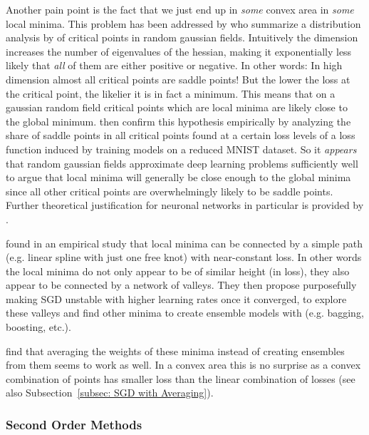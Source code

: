 Another pain point is the fact that we just end up in \emph{some} convex area in
\emph{some} local minima. This problem has been addressed by \textcite{pascanuSaddlePointProblem2014}
who summarize a distribution analysis by \textcite{brayStatisticsCriticalPoints2007}
of critical points in random gaussian fields. Intuitively the dimension
increases the number of eigenvalues of the hessian, making it
exponentially less likely that \emph{all} of them are either positive or 
negative. In other words: In high dimension almost all critical points are
saddle points! But the lower the loss at the critical point, the likelier it is
in fact a minimum. This means that on a gaussian random field critical points
which are local minima are likely close to the global minimum. \textcite{pascanuSaddlePointProblem2014}
then confirm this hypothesis empirically by analyzing the share of saddle
points in all critical points found at a certain loss levels of a loss function
induced by training models on a reduced MNIST dataset. So it \emph{appears} that
random gaussian fields approximate deep learning problems sufficiently well to
argue that local minima will generally be close enough to the global minima
since all other critical points are overwhelmingly likely to be saddle points.
Further theoretical justification for neuronal networks in particular is
provided by \textcite{choromanskaLossSurfacesMultilayer2015}.

\textcite{garipovLossSurfacesMode2018} found in an empirical study that local
minima can be connected by a simple path (e.g. linear spline with just one
free knot) with near-constant loss. In other words the local minima do not only
appear to be of similar height (in loss), they also appear to be connected
by a network of valleys. They then propose purposefully making SGD unstable
with higher learning rates once it converged, to explore these valleys and find
other minima to create ensemble models with (e.g. bagging, boosting, etc.). 

\textcite{izmailovAveragingWeightsLeads2019} find that averaging the weights
of these minima instead of creating ensembles from them seems to work as well.
In a convex area this is no surprise as a convex combination of points
has smaller loss than the linear combination of losses (see also
Subsection~\ref{subsec: SGD with Averaging}).


\subsubsection{Second Order Methods}


